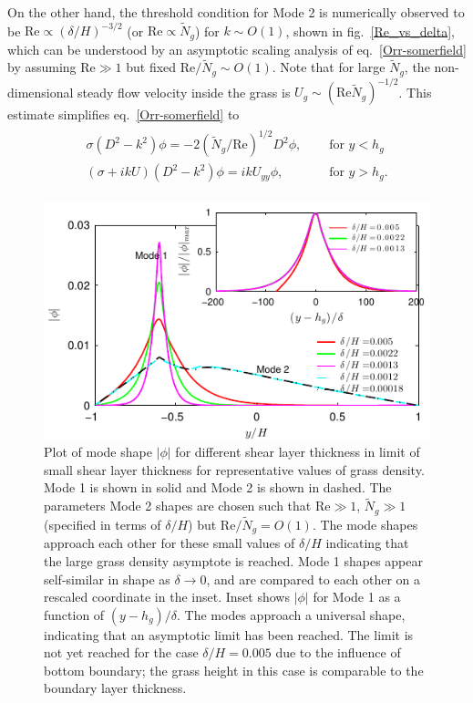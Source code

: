\documentclass[aps,prl,twocolumn,superscriptaddress,10pt]{revtex4-1}  %
\newcommand{\hg}{h_g}
\newcommand{\Rey}{\text{Re}}
\newcommand{\Ndg}{\tilde{N}_g}
\begin{document}
On the other hand, the threshold condition for Mode 2 is numerically observed to be $\Rey \propto ({\delta}/{H})^{-3/2}$ (or $\Rey \propto \Ndg$) for $k\sim O(1)$, shown in fig.~\ref{Re_vs_delta}, which can be understood by an asymptotic scaling analysis of eq.~\eqref{Orr-somerfield} by assuming $\Rey \gg 1$ but fixed $\Rey/\Ndg \sim O(1)$.
Note that for large $\Ndg$, the non-dimensional steady flow velocity inside the grass is $U_g \sim (\Rey \Ndg)^{-1/2}$. 
This estimate simplifies eq.~\eqref{Orr-somerfield} to 
\begin{align}
\begin{split}
\sigma\left(D^2-k^2\right)\phi = -2{(\Ndg/\Rey)^{1/2}}D^2\phi,  \quad &\text{ for $y<\hg$}  \\
\left(\sigma+ikU\right) \left(D^2-k^2\right)\phi =  ikU_{yy}\phi, \quad &\text{ for $y>\hg$}.
\end{split}
\label{eqn:mode2asymp}
\end{align}
\begin{figure}
\includegraphics[]{Asymptotic_noshear}
\caption{Plot of mode shape $|\phi|$ for different shear layer thickness in limit of small shear layer thickness for representative values of grass density. 
Mode 1 is shown in solid and Mode 2 is shown in dashed. The parameters Mode 2 shapes are chosen such that $\Rey \gg 1$, $\Ndg \gg 1$ (specified in terms of $\delta/H$) but $\Rey/\Ndg = O(1)$. 
The mode shapes approach each other for these small values of $\delta/H$ indicating that the large grass density asymptote is reached. Mode 1 shapes appear self-similar in shape as $\delta\to 0$, 
and are compared to each other on a rescaled coordinate in the inset. 
Inset shows $|\phi|$ for Mode 1 as a function of $(y-\hg)/\delta$. The modes approach a universal shape, indicating that an asymptotic limit has been reached. 
The limit is not yet reached for the case $\delta/H = 0.005$ due to the influence of bottom boundary; the grass height in this case is comparable to the boundary layer thickness.}
\label{Asymptotic_mode}
\end{figure}
\end{document}
